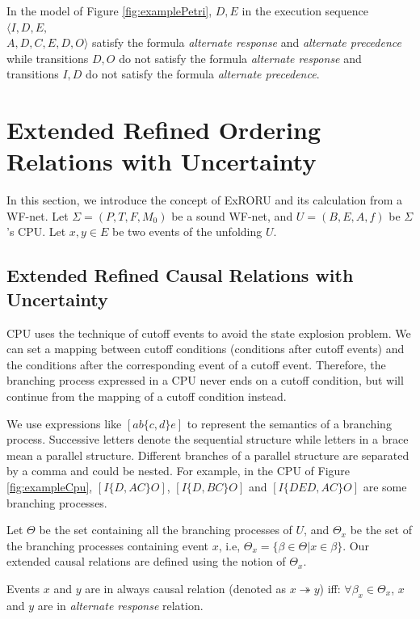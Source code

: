 \documentclass{llncs}
\begin{document}
\begin{example}\label{ex:relationFormulas}
In the model of Figure \ref{fig:examplePetri}, $D,E$ in the execution sequence $\langle I,D,E,$\\$A,D,C,E,D,O\rangle$ satisfy the formula \textit{alternate response} and \textit{alternate precedence} while transitions $D,O$ do not satisfy the formula \textit{alternate response} and transitions $I,D$ do not satisfy the formula \textit{alternate precedence}.
\end{example}

\section{Extended Refined Ordering Relations with Uncertainty}\label{sec:relations}
In this section, we introduce the concept of ExRORU and its calculation from a WF-net. Let $\Sigma=(P,T,F,M_{0})$ be a sound WF-net, and $U=(B,E,A,f)$ be $\Sigma$'s CPU. Let $x,y\in E$ be two events of the unfolding $U$.

\subsection{Extended Refined Causal Relations with Uncertainty}\label{subsec:causalAndInverseCausal}
CPU uses the technique of cutoff events to avoid the state explosion problem. We can set a mapping between cutoff conditions (conditions after cutoff events) and the conditions after the corresponding event of a cutoff event. Therefore, the branching process expressed in a CPU never ends on a cutoff condition, but will continue from the mapping of a cutoff condition instead.

We use expressions like $[ab\{c,d\}e]$ to represent the semantics of a branching process. Successive letters denote the sequential structure while letters in a brace mean a parallel structure. Different branches of a parallel structure are separated by a comma and could be nested. For example, in the CPU of Figure \ref{fig:exampleCpu}, $[I\{D,AC\}O]$, $[I\{D,BC\}O]$ and $[I\{DED,AC\}O]$ are some branching processes.

Let $\Theta$ be the set containing all the branching processes of $U$, and $\Theta_{x}$ be the set of the branching processes containing event $x$, i.e, $\Theta_{x}=\{\beta\in\Theta|x\in\beta\}$. Our extended causal relations are defined using the notion of $\Theta_{x}$.

\begin{definition}\label{def:alwaysCausal}
Events $x$ and $y$ are in always causal relation (denoted as $x\twoheadrightarrow y$) iff: $\forall\beta_{x}\in\Theta_{x}$, $x$ and $y$ are in \textit{alternate response} relation.
\end{definition}
\end{document}
